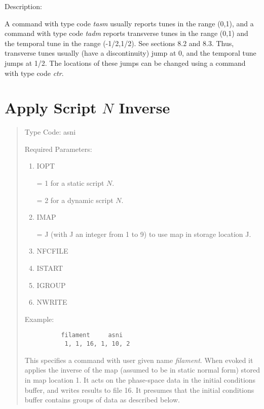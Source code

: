 \vspace{5mm}
     Description:
\vspace{2mm}

A command with type code {\em tasm} usually reports tunes in the range (0,1), and a command with type code {\em tadm} reports transverse tunes in the range (0,1) and the temporal tune in the range (-1/2,1/2).  See sections 8.2 and 8.3.  Thus, transverse tunes usually (have a discontinuity) jump at 0, and the temporal tune jumps at 1/2.  The locations of these jumps can be changed using a command with type code {\em ctr}.

\newpage
\section{Apply Script $N$ Inverse} 
\begin{quotation}
\noindent     Type Code:  asni
\vspace{5mm}

\noindent Required Parameters:
\begin{enumerate}
       \item  IOPT

              = 1 for a static script $N$.

              = 2 for a dynamic script $N$.

       \item  IMAP

              = J (with J an integer from 1 to 9) to use map in storage
                location J.

       \item  NFCFILE

       \item  ISTART

       \item  IGROUP

       \item  NWRITE
\end{enumerate}

\vspace{5mm}
\noindent Example:
\begin{verbatim}
          filament     asni
           1, 1, 16, 1, 10, 2
\end{verbatim}
This specifies a command with user given name {\em filament}. When evoked it applies the inverse of the map (assumed to be in static normal form) stored in map location 1.  It acts on the phase-space data in the initial conditions buffer, and writes results to file 16.  It presumes that the initial conditions buffer contains groups of data as described below.
\end{quotation}

